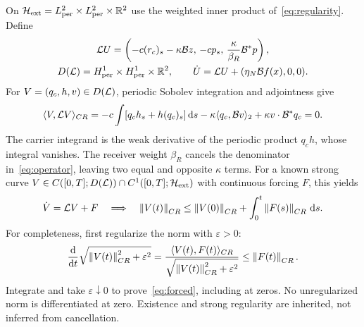 On $\mathcal H_{\rm ext}=L^2_{\rm per}\times L^2_{\rm per}\times\mathbb R^2$ use the weighted inner product of~\eqref{eq:regularity}. Define
\begin{equation}\label{eq:operator}%
\begin{gathered}
\LL U=\left(-c(r_c)_s-\kappa\B z,\,-cp_s,\,
\frac{\kappa}{\beta_R}\B^*p\right),\\
D(\LL)=H^1_{\rm per}\times H^1_{\rm per}\times\R^2,\qquad
\dot U=\LL U+(\eta_N\B f(x),0,0).
\end{gathered}
\end{equation}
For $V=(q_c,h,v)\in D(\mathcal L)$, periodic Sobolev integration and adjointness give
\begin{equation}\label{eq:cancellation}%
\langle V,\LL V\rangle_{CR}
=-c\int[q_ch_s+h(q_c)_s]\dd s
-\kappa\langle q_c,\B v\rangle_2
+\kappa v\cdot\B^*q_c=0.
\end{equation}
The carrier integrand is the weak derivative of the periodic product $q_ch$, whose integral vanishes. The receiver weight $\beta_R$ cancels the denominator in~\eqref{eq:operator}, leaving two equal and opposite $\kappa$ terms. For a known strong curve
$V\in C([0,T];D(\mathcal L))\cap C^1([0,T];\mathcal H_{\rm ext})$
with continuous forcing $F$, this yields
\begin{equation}\label{eq:forced}%
\dot V=\LL V+F
\quad\Longrightarrow\quad
\norm{V(t)}_{CR}\le\norm{V(0)}_{CR}
+\int_0^t\norm{F(s)}_{CR}\dd s.
\end{equation}
For completeness, first regularize the norm with $\varepsilon>0$:
\begin{equation}\label{eq:regularized}%
\frac{\mathrm d}{\mathrm dt}\sqrt{\norm{V(t)}_{CR}^2+\varepsilon^2}
=\frac{\langle V(t),F(t)\rangle_{CR}}
{\sqrt{\norm{V(t)}_{CR}^2+\varepsilon^2}}
\le\norm{F(t)}_{CR}.
\end{equation}
Integrate and take $\varepsilon\downarrow0$ to prove~\eqref{eq:forced}, including at zeros. No unregularized norm is differentiated at zero. Existence and strong regularity are inherited, not inferred from cancellation.

